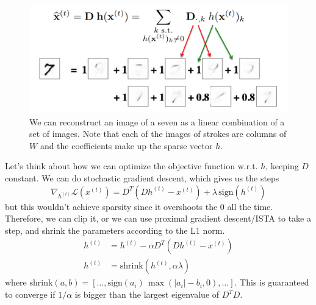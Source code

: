  \begin{figure}[H]
    \centering 
    \includegraphics[scale=0.4]{img/sparse_coding.png}
    \caption{We can reconstruct an image of a seven as a linear combination of a set of images. Note that each of the images of strokes are columns of $W$ and the coefficients make up the sparse vector $h$. } 
    \label{fig:sparse_coding}
  \end{figure}

  Let's think about how we can optimize the objective function w.r.t. $h$, keeping $D$ constant. We can do stochastic gradient descent, which gives us the steps
  \begin{equation}
    \nabla_{h^{(t)}} \mathcal{L}(x^{(t)}) = D^T (D h^{(t)} - x^{(t)}) + \lambda \, \mathrm{sign}(h^{(t)})
  \end{equation}
  but this wouldn't achieve sparsity since it overshoots the $0$ all the time. Therefore, we can clip it, or we can use proximal gradient descent/ISTA to take a step, and shrink the parameters according to the L1 norm. 
  \begin{align} 
    h^{(t)} & = h^{(t)} - \alpha D^T (D h^{(t)} - x^{(t)}) \\
    h^{(t)} & = \mathrm{shrink}(h^{(t)}, \alpha \lambda)
  \end{align}
  where $\mathrm{shrink}(a, b) = [\ldots, \mathrm{sign}(a_i)\, \max(|a_i| - b_i, 0), \ldots]$. This is guaranteed to converge if $1/\alpha$ is bigger than the largest eigenvalue of $D^T D$.  

